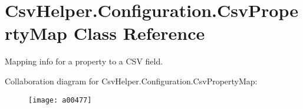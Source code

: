 \hypertarget{a00064}{\section{Csv\-Helper.\-Configuration.\-Csv\-Property\-Map Class Reference}
\label{a00064}
}


Mapping info for a property to a C\-S\-V field.  




Collaboration diagram for Csv\-Helper.\-Configuration.\-Csv\-Property\-Map\-:
\nopagebreak
\begin{figure}[H]
\begin{center}
\leavevmode
\texttt{[image: a00477]}
\end{center}
\end{figure}
